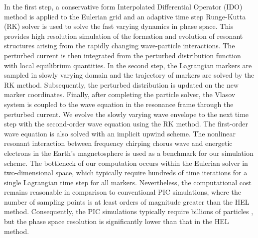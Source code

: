 In the first step,  a conservative form Interpolated Differential Operator (IDO)  method is applied to the Eulerian grid 
and  an adaptive time step Runge-Kutta (RK)  solver is used to solve the  fast varying dynamics in  phase space. 
This provides high resolution simulation of 
the formation and evolution of resonant structures arising from the rapidly changing wave-particle interactions.
The perturbed current is then integrated from the perturbed distribution function with local equilibrium quantities.
In the second step, the  Lagrangian markers are sampled in slowly varying domain 
and 
the trajectory of markers
are solved by the RK method.
Subsequently,  the perturbed distribution is updated on the new marker coordinates. 
Finally, after completing the particle solver, 
the Vlasov system is coupled to the wave equation in the resonance frame through the perturbed current.
We evolve the  slowly varying wave envelope 
to the next time step
with the second-order  wave equation
using the RK method.
The first-order wave equation is also solved with 
 an implicit upwind scheme.
The nonlinear resonant interaction between frequency chirping  chorus wave and energetic electrons in the Earth's magnetosphere is used as a benchmark for our simulation scheme.
The bottleneck of our computation occurs within the Eulerian solver in two-dimensional space, which typically require hundreds of time iterations for a single Lagrangian time step for all markers. Nevertheless, the computational cost remains reasonable in comparison to conventional PIC simulations, where the number of sampling points is at least orders of magnitude greater than the HEL  method. Consequently, the PIC simulations typically require billions of particles \cite{nogi2022,katoh2016}, but the phase space resolution is significantly lower than 
that in the HEL method.



